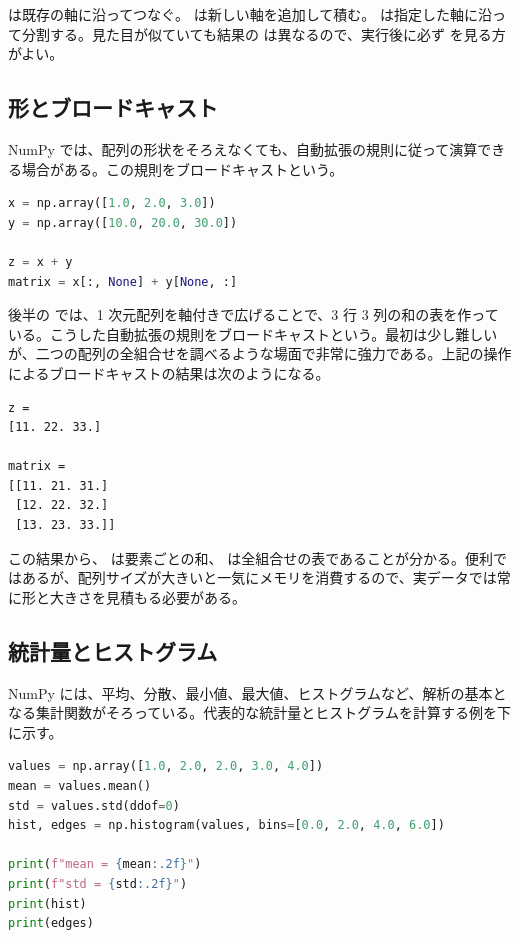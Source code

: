  は既存の軸に沿ってつなぐ。 は新しい軸を追加して積む。 は指定した軸に沿って分割する。見た目が似ていても結果の  は異なるので、実行後に必ず  を見る方がよい。

\subsection{形とブロードキャスト}

NumPy では、配列の形状をそろえなくても、自動拡張の規則に従って演算できる場合がある。この規則をブロードキャストという。

\begin{lstlisting}[language=Python]
x = np.array([1.0, 2.0, 3.0])
y = np.array([10.0, 20.0, 30.0])

z = x + y
matrix = x[:, None] + y[None, :]
\end{lstlisting}

後半の  では、1 次元配列を軸付きで広げることで、3 行 3 列の和の表を作っている。こうした自動拡張の規則をブロードキャストという。最初は少し難しいが、二つの配列の全組合せを調べるような場面で非常に強力である。上記の操作によるブロードキャストの結果は次のようになる。

\begin{lstlisting}[numbers=none, xleftmargin=2\zw]
z =
[11. 22. 33.]

matrix =
[[11. 21. 31.]
 [12. 22. 32.]
 [13. 23. 33.]]
\end{lstlisting}

この結果から、 は要素ごとの和、 は全組合せの表であることが分かる。便利ではあるが、配列サイズが大きいと一気にメモリを消費するので、実データでは常に形と大きさを見積もる必要がある。

\subsection{統計量とヒストグラム}

NumPy には、平均、分散、最小値、最大値、ヒストグラムなど、解析の基本となる集計関数がそろっている。代表的な統計量とヒストグラムを計算する例を下に示す。

\begin{lstlisting}[language=Python]
values = np.array([1.0, 2.0, 2.0, 3.0, 4.0])
mean = values.mean()
std = values.std(ddof=0)
hist, edges = np.histogram(values, bins=[0.0, 2.0, 4.0, 6.0])

print(f"mean = {mean:.2f}")
print(f"std = {std:.2f}")
print(hist)
print(edges)
\end{lstlisting}


